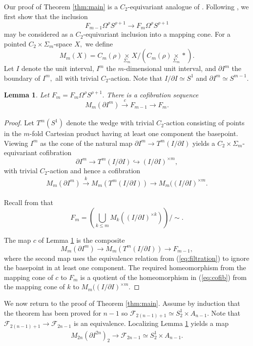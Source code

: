 \documentclass[]{amsart}  %
\newtheorem{lemma}[equation]{Lemma}
\theoremstyle{definition}
\numberwithin{equation}{section}
\numberwithin{figure}{section}
\newcommand{\cF}{{\mathcal F}}
\newcommand{\0}{\langle 0 \rangle}
\begin{document}
Our proof of Theorem \ref{thm:main} is a $C_2$-equivariant analogue of \cite[. Proof of Theorem~1.3]{CDGM1988}. Following \cite{CDGM1988}, we first show that the inclusion 
$$F_{m - 1} \Omega^\rho S^{\rho + 1} \to F_m \Omega^\rho S^{\rho + 1}$$ may be considered as a $C_2$-equivariant inclusion into a mapping cone. For a pointed $C_2 \times \Sigma_m$-space $X,$ we define
	$$ M_m(X) = C_m(\rho) \underset{\Sigma_m}{\times} X / (C_m(\rho) \underset{\Sigma_m}{\times}{*}). $$
	Let $I$ denote the unit interval, $I^m$ the $m$-dimensional unit interval, and $\partial I^m$ the boundary of $I^m,$ all with trivial $C_2$-action. Note that $I / \partial I \simeq S^1$ and $\partial I^m \simeq S^{m - 1}.$
	
	\begin{lemma} \label{lemma}
		Let $F_m = F_m \Omega^\rho S^{\rho + 1}.$ There is a cofibration sequence
		$$ M_m (\partial I^m) \xrightarrow[]{c} F_{m - 1} \to F_m. $$
	\end{lemma}
	
	\begin{proof}
		Let $T^m(S^1)$ denote the wedge with trivial $C_2$-action consisting of points in the $m$-fold Cartesian product having at least one component the basepoint. Viewing $I^m$ as the cone of the natural map $\partial I^m \to T^m (I / \partial I)$ yields a $C_2 \times \Sigma_m$-equivariant cofibration
		$$ \partial I^m \to T^m (I / \partial I) \hookrightarrow (I / \partial I)^{\times m}, $$
		with trivial $C_2$-action and hence a cofibration 
		\begin{align} \label{eq:cofib}
			M_m(\partial I^m) \xrightarrow[]{k} M_m (T^m(I / \partial I)) \to M_m((I/ \partial I)^{\times m}. 
		\end{align}
		
		Recall from \cite{RS200} that
		$$ F_m = \left( \bigcup_{k \leq m} M_k ((I / \partial I)^{\times k} ) \right) / \sim. $$
		
		The map $c$ of Lemma \ref{lemma} is the composite
		$$ M_m(\partial I^m) \to M_m (T^m (I / \partial I)) \to F_{m - 1}, $$
		where the second map uses the equivalence relation from (\ref{eq:filtration}) to ignore the basepoint in at least one component. The required homeomorphism from the mapping cone of $c$ to $F_m$ is a quotient of the homeomorphism in (\ref{eq:cofib}) from the mapping cone of $k$ to $M_m((I / \partial I)^{\times m}.$
	\end{proof}
	
	We now return to the proof of Theorem \ref{thm:main}. Assume by induction that the theorem has been proved for $n - 1$ so $\cF_{2(n - 1) + 1} \simeq S_2^1 \times A_{n - 1}.$ Note that $\cF_{2(n - 1) + 1} \to \cF_{2n - 1}$ is an equivalence. Localizing Lemma \ref{lemma} yields a map
	\begin{align} \label{eq:partial} M_{2n} (\partial I^{2n})_2 \to \cF_{2n - 1} \simeq S_2^1 \times A_{n - 1}.
        \end{align}
\end{document}
